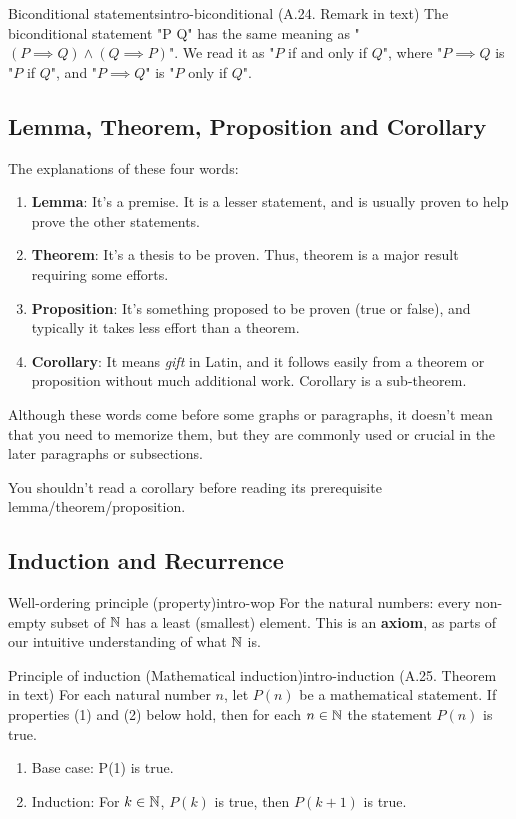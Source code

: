 \documentclass[../src/handouts/main.tex]{subfiles}
\begin{document}
\begin{remark}{Biconditional statements}{intro-biconditional}
  (A.24. Remark in text)
  The biconditional statement "P \iff Q" has the same meaning as "$(P \implies Q) \land (Q \implies P)$". We read it as "$P$ if and only if $Q$", where "$P \implies Q$ is "$P$ if $Q$", and "$P \implies Q$" is "$P$ only if $Q$".
\end{remark}

\subsection{Lemma, Theorem, Proposition and Corollary}

The explanations of these four words:
\begin{enumerate}
  \item \textbf{Lemma}: It's a premise. It is a lesser statement, and is usually proven to help prove the other statements.
  \item \textbf{Theorem}: It's a thesis to be proven. Thus, theorem is a major result requiring some efforts.
  \item \textbf{Proposition}: It's something proposed to be proven (true or false), and typically it takes less effort than a theorem.
  \item \textbf{Corollary}: It means \textit{gift} in Latin, and it follows easily from a theorem or proposition without much additional work. Corollary is a sub-theorem.
\end{enumerate}

Although these words come before some graphs or paragraphs, it doesn't mean that you need to memorize them, but they are commonly used or crucial in the later paragraphs or subsections.

You shouldn't read a corollary before reading its prerequisite lemma/theorem/proposition.

\subsection{Induction and Recurrence}

\begin{principle}{Well-ordering principle (property)}{intro-wop}
  For the natural numbers: every non-empty subset of $\mathbb{N}$ has a least (smallest) element.
  This is an \textbf{axiom}, as parts of our intuitive understanding of what $\mathbb{N}$ is.
\end{principle}

\begin{principle}{Principle of induction (Mathematical induction)}{intro-induction}
  (A.25. Theorem in text)
  For each natural number $n$, let $P(n)$ be a mathematical statement.
  If properties (1) and (2) below hold, then for each $n \in \mathbb{N}$ the statement $P(n)$ is true.
  \begin{enumerate}
    \item Base case: P(1) is true.
    \item Induction: For $k \in \mathbb{N}$, $P(k)$ is true, then $P(k + 1)$ is true.
  \end{enumerate}
\end{principle}
\end{document}
